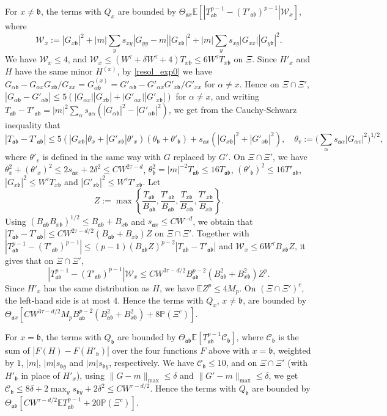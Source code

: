 \documentclass{article}
\newcommand{\1}{\mathds{1}}
\numberwithin{equation}{section}
\newcommand{\al}{\alpha}
\newcommand{\fa}{{\mathfrak a}}
\newcommand{\fb}{{\mathfrak b}}
\renewcommand{\cal}{\mathcal}
\renewcommand{\leq}{\leqslant}
\renewcommand{\le}{\leq}
\renewcommand{\P}{\mathbb{P}}
\newcommand{\E}{\mathbb{E}}
\theoremstyle{plain} %
\theoremstyle{remark}
\begin{document}
For $x\ne \fb$, the terms with $Q_x$ are bounded by $\Theta_{\fa x}\E[|T_{\fa\fb}^{p-1}-(T'_{\fa\fb})^{p-1}|\cal W_x]$, where
$$\cal W_x:=|G_{x\fb}|^2+|m|\sum_y s_{xy}|G_{yy}-m||G_{x\fb}|^2+|m|\sum_y s_{xy}|G_{xx}||G_{y\fb}|^2 .$$
We have $\cal W_x\le 4$, and $\cal W_x\le (W^\tau+\delta W^\tau+4)T_{x\fb}\le 6W^\tau T_{x\fb}$ on $\Xi$. Since $H'_x$ and $H$ have the same minor $H^{(x)}$, by \eqref{resol_exp0} we have $G_{\al\fb}-G_{\al x}G_{x\fb}/G_{xx}=G^{(x)}_{\al\fb}=G'_{\al\fb}-G'_{\al x}G'_{x\fb}/G'_{xx}$ for $\al\ne x$. Hence on $\Xi\cap \Xi'$, $|G_{\al\fb}-G'_{\al\fb}|\le 5(|G_{\al x}||G_{x\fb}|+|G'_{\al x}||G'_{x\fb}|)$ for $\al \ne x$, and writing $T_{\fa\fb}-T'_{\fa\fb}=|m|^2\sum_\al s_{\fa\al}(|G_{\al\fb}|^2-|G'_{\al\fb}|^2)$, we get from the Cauchy-Schwarz inequality that
$$|T_{\fa\fb}-T'_{\fa\fb}|\le 5\left(|G_{x\fb}|\theta_x+|G'_{x\fb}|\theta'_x\right)\left(\theta_\fb+\theta'_\fb\right)+s_{\fa x}\left(|G_{x\fb}|^2+|G'_{x\fb}|^2\right),\quad \theta_v:=\Big(\sum_\al s_{\fa\al}|G_{\al v}|^2\Big)^{1/2},$$
where $\theta'_v$ is defined in the same way with $G$ replaced by $G'$. On $\Xi\cap\Xi'$, we have $\theta_x^2+(\theta'_x)^2\le 2s_{\fa x}+2\delta^2\le CW^{2\tau-d}$, $\theta_\fb^2=|m|^{-2}T_{\fa\fb}\le 16T_{\fa\fb}$, $(\theta'_\fb)^2\le 16T'_{\fa\fb}$, $|G_{x\fb}|^2\le W^\tau T_{x\fb}$ and $|G'_{x\fb}|^2\le W^\tau T'_{x\fb}$. Let 
$$Z:=\max\left\{\frac{T_{\fa\fb}}{B_{\fa\fb}},\frac{T'_{\fa\fb}}{B_{\fa\fb}},\frac{T_{x\fb}}{B_{x\fb}},\frac{T'_{x\fb}}{B_{x\fb}}\right\}.$$
Using $(B_{\fa\fb}B_{x\fb})^{1/2}\le B_{\fa\fb}+B_{x\fb}$ and $s_{\fa x}\le CW^{-d}$, we obtain that $|T_{\fa\fb}-T'_{\fa\fb}|\le CW^{2\tau-d/2}(B_{\fa\fb}+B_{x\fb})Z$ on $\Xi\cap\Xi'$. Together with $|T_{\fa\fb}^{p-1}-(T'_{\fa\fb})^{p-1}|\le (p-1)(B_{\fa\fb}Z)^{p-2}|T_{\fa\fb}-T'_{\fa\fb}|$ and $\cal W_x\le 6W^\tau B_{x\fb}Z$, it gives that on $\Xi\cap\Xi'$,
$$|T_{\fa\fb}^{p-1}-(T'_{\fa\fb})^{p-1}|\cal W_x\le CW^{3\tau-d/2}B_{\fa\fb}^{p-2}\left(B_{\fa\fb}^2+B_{x\fb}^2\right)Z^p .$$
Since $H'_x$ has the same distribution as $H$, we have $\E Z^p\le 4M_p$. On $(\Xi\cap\Xi')^c$, the left-hand side is at most $4$. Hence the terms with $Q_x$, $x\ne \fb$, are bounded by $\Theta_{\fa x}[CW^{3\tau-d/2}M_pB_{\fa\fb}^{p-2}(B_{\fa\fb}^2+B_{x\fb}^2)+8\P(\Xi^c)]$.

For $x=\fb$, the terms with $Q_\fb$ are bounded by $\Theta_{\fa\fb}\E[T_{\fa\fb}^{p-1}\cal C_\fb]$, where $\cal C_\fb$ is the sum of $|F(H)-F(H'_\fb)|$ over the four functions $F$ above with $x=\fb$, weighted by $1$, $|m|$, $|m|s_{\fb y}$ and $|m|s_{\fb y}$, respectively. We have $\cal C_\fb\le 10$, and on $\Xi\cap\Xi'$ (with $H'_\fb$ in place of $H'_x$), using $\|G-m\|_{\max}\le \delta$ and $\|G'-m\|_{\max}\le \delta$, we get $\cal C_\fb\le 8\delta+2\max_{y}s_{\fb y}+2\delta^2\le CW^{\tau-d/2}$. Hence the terms with $Q_\fb$ are bounded by $\Theta_{\fa\fb}[CW^{\tau-d/2}\E T_{\fa\fb}^{p-1}+20\P(\Xi^c)]$.
\end{document}
